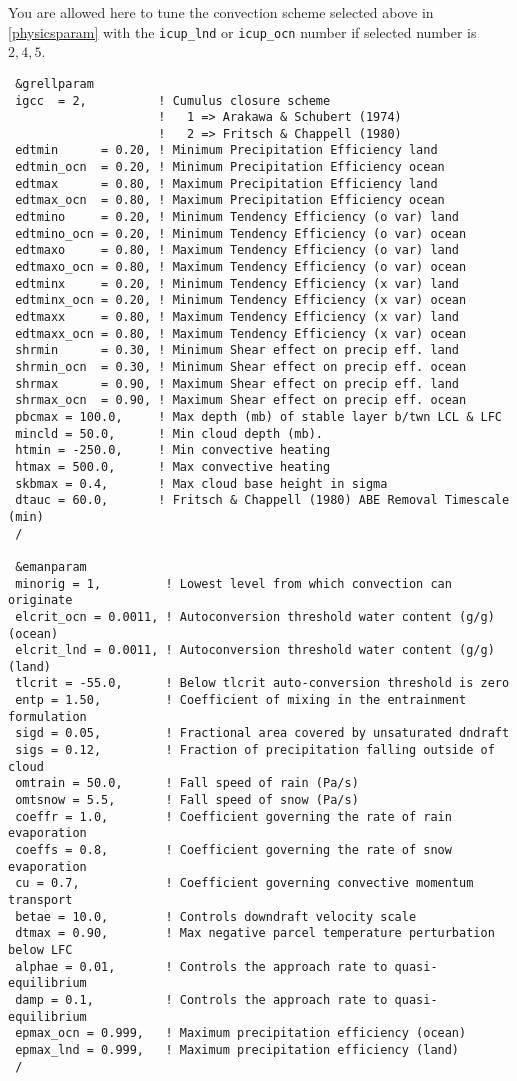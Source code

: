 You are allowed here to tune the convection scheme selected above in
\ref{physicsparam} with the \verb=icup_lnd= or \verb=icup_ocn= number if
selected number is $2, 4, 5$.

{\footnotesize
\begin{Verbatim}
 &grellparam
 igcc  = 2,          ! Cumulus closure scheme
                     !   1 => Arakawa & Schubert (1974)
                     !   2 => Fritsch & Chappell (1980)
 edtmin      = 0.20, ! Minimum Precipitation Efficiency land
 edtmin_ocn  = 0.20, ! Minimum Precipitation Efficiency ocean
 edtmax      = 0.80, ! Maximum Precipitation Efficiency land
 edtmax_ocn  = 0.80, ! Maximum Precipitation Efficiency ocean
 edtmino     = 0.20, ! Minimum Tendency Efficiency (o var) land
 edtmino_ocn = 0.20, ! Minimum Tendency Efficiency (o var) ocean
 edtmaxo     = 0.80, ! Maximum Tendency Efficiency (o var) land
 edtmaxo_ocn = 0.80, ! Maximum Tendency Efficiency (o var) ocean
 edtminx     = 0.20, ! Minimum Tendency Efficiency (x var) land
 edtminx_ocn = 0.20, ! Minimum Tendency Efficiency (x var) ocean
 edtmaxx     = 0.80, ! Maximum Tendency Efficiency (x var) land
 edtmaxx_ocn = 0.80, ! Maximum Tendency Efficiency (x var) ocean
 shrmin      = 0.30, ! Minimum Shear effect on precip eff. land
 shrmin_ocn  = 0.30, ! Minimum Shear effect on precip eff. ocean
 shrmax      = 0.90, ! Maximum Shear effect on precip eff. land
 shrmax_ocn  = 0.90, ! Maximum Shear effect on precip eff. ocean
 pbcmax = 100.0,     ! Max depth (mb) of stable layer b/twn LCL & LFC
 mincld = 50.0,      ! Min cloud depth (mb).
 htmin = -250.0,     ! Min convective heating
 htmax = 500.0,      ! Max convective heating
 skbmax = 0.4,       ! Max cloud base height in sigma
 dtauc = 60.0,       ! Fritsch & Chappell (1980) ABE Removal Timescale (min)
 /

 &emanparam
 minorig = 1,         ! Lowest level from which convection can originate
 elcrit_ocn = 0.0011, ! Autoconversion threshold water content (g/g) (ocean)
 elcrit_lnd = 0.0011, ! Autoconversion threshold water content (g/g) (land)
 tlcrit = -55.0,      ! Below tlcrit auto-conversion threshold is zero
 entp = 1.50,         ! Coefficient of mixing in the entrainment formulation
 sigd = 0.05,         ! Fractional area covered by unsaturated dndraft
 sigs = 0.12,         ! Fraction of precipitation falling outside of cloud
 omtrain = 50.0,      ! Fall speed of rain (Pa/s)
 omtsnow = 5.5,       ! Fall speed of snow (Pa/s)
 coeffr = 1.0,        ! Coefficient governing the rate of rain evaporation
 coeffs = 0.8,        ! Coefficient governing the rate of snow evaporation
 cu = 0.7,            ! Coefficient governing convective momentum transport
 betae = 10.0,        ! Controls downdraft velocity scale
 dtmax = 0.90,        ! Max negative parcel temperature perturbation below LFC
 alphae = 0.01,       ! Controls the approach rate to quasi-equilibrium
 damp = 0.1,          ! Controls the approach rate to quasi-equilibrium
 epmax_ocn = 0.999,   ! Maximum precipitation efficiency (ocean)
 epmax_lnd = 0.999,   ! Maximum precipitation efficiency (land)
 /


\end{Verbatim}}
